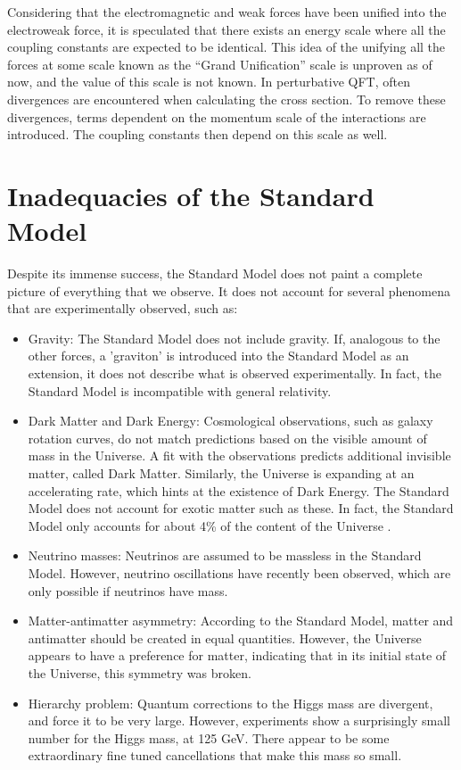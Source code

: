 \documentclass[11pt,a4paper,openright,twoside]{report}
\begin{document}
Considering that the electromagnetic and weak forces have been unified into the electroweak force, it is speculated that there exists an energy scale where all the coupling constants are expected to be identical. This idea of the unifying all the forces at some scale known as the ``Grand Unification'' scale is unproven as of now, and the value of this scale is not known. In perturbative QFT, often divergences are encountered when calculating the cross section. To remove these divergences, terms dependent on the momentum scale of the interactions are introduced. The coupling constants then depend on this scale as well.

\section{Inadequacies of the Standard Model}
Despite its immense success, the Standard Model does not paint a complete picture of everything that we observe. It does not account for several phenomena that are experimentally observed, such as:
\begin{itemize}
\item Gravity: The Standard Model does not include gravity. If, analogous to the other forces, a 'graviton' is introduced into the Standard Model as an extension, it does not describe what is observed experimentally. In fact, the Standard Model is incompatible with general relativity\cite{grav_inc}.

\item Dark Matter and Dark Energy: Cosmological observations, such as galaxy rotation curves, do not match predictions based on the visible amount of mass in the Universe. A fit with the observations predicts additional invisible matter, called Dark Matter\cite{DM_inc}. Similarly, the Universe is expanding at an accelerating rate, which hints at the existence of Dark Energy\cite{DE}. The Standard Model does not account for exotic matter such as these. In fact, the Standard Model only accounts for about 4\% of the content of the Universe \cite{Planck,DM_comp}.

\item Neutrino masses: Neutrinos are assumed to be massless in the Standard Model. However, neutrino oscillations have recently been observed\cite{neutrino2}, which are only possible if neutrinos have mass\cite{neutrino_mass}.

\item Matter-antimatter asymmetry: According to the Standard Model, matter and antimatter should be created in equal quantities. However, the Universe appears to have a preference for matter, indicating that in its initial state of the Universe, this symmetry was broken\cite{Baryon_Asymmetry}.

\item Hierarchy problem\cite{hierarchy1,hierarchy2,hierarchy3,hierarchy4}: Quantum corrections to the Higgs mass are divergent, and force it to be very large. However, experiments show a surprisingly small number for the Higgs mass, at 125 GeV. There appear to be some extraordinary fine tuned cancellations that make this mass so small.
\end{itemize}
\end{document}

